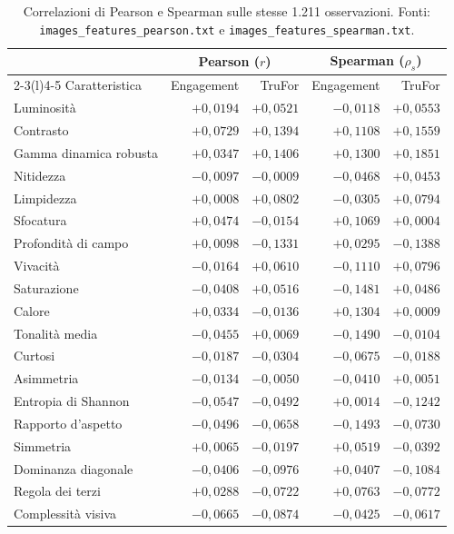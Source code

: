 \begin{table}[htbp]
    \centering
    \small
    \caption{Correlazioni di Pearson e Spearman sulle stesse 1.211 osservazioni. Fonti: \texttt{images\_features\_pearson.txt} e \texttt{images\_features\_spearman.txt}.}
    \label{tab:risultati-feature-correlazioni}
    \begin{tabular}{@{}lrrrr@{}}
        \toprule
        & \multicolumn{2}{c}{Pearson ($r$)} & \multicolumn{2}{c}{Spearman ($\rho_s$)} \\
        \cmidrule(lr){2-3}\cmidrule(l){4-5}
        Caratteristica & Engagement & TruFor & Engagement & TruFor \\
        \midrule
        Luminosità & $+0{,}0194$ & $+0{,}0521$ & $-0{,}0118$ & $+0{,}0553$ \\
        Contrasto & $+0{,}0729$ & $+0{,}1394$ & $+0{,}1108$ & $+0{,}1559$ \\
        Gamma dinamica robusta & $+0{,}0347$ & $+0{,}1406$ & $+0{,}1300$ & $+0{,}1851$ \\
        Nitidezza & $-0{,}0097$ & $-0{,}0009$ & $-0{,}0468$ & $+0{,}0453$ \\
        Limpidezza & $+0{,}0008$ & $+0{,}0802$ & $-0{,}0305$ & $+0{,}0794$ \\
        Sfocatura & $+0{,}0474$ & $-0{,}0154$ & $+0{,}1069$ & $+0{,}0004$ \\
        Profondità di campo & $+0{,}0098$ & $-0{,}1331$ & $+0{,}0295$ & $-0{,}1388$ \\
        Vivacità & $-0{,}0164$ & $+0{,}0610$ & $-0{,}1110$ & $+0{,}0796$ \\
        Saturazione & $-0{,}0408$ & $+0{,}0516$ & $-0{,}1481$ & $+0{,}0486$ \\
        Calore & $+0{,}0334$ & $-0{,}0136$ & $+0{,}1304$ & $+0{,}0009$ \\
        Tonalità media & $-0{,}0455$ & $+0{,}0069$ & $-0{,}1490$ & $-0{,}0104$ \\
        Curtosi & $-0{,}0187$ & $-0{,}0304$ & $-0{,}0675$ & $-0{,}0188$ \\
        Asimmetria & $-0{,}0134$ & $-0{,}0050$ & $-0{,}0410$ & $+0{,}0051$ \\
        Entropia di Shannon & $-0{,}0547$ & $-0{,}0492$ & $+0{,}0014$ & $-0{,}1242$ \\
        Rapporto d'aspetto & $-0{,}0496$ & $-0{,}0658$ & $-0{,}1493$ & $-0{,}0730$ \\
        Simmetria & $+0{,}0065$ & $-0{,}0197$ & $+0{,}0519$ & $-0{,}0392$ \\
        Dominanza diagonale & $-0{,}0406$ & $-0{,}0976$ & $+0{,}0407$ & $-0{,}1084$ \\
        Regola dei terzi & $+0{,}0288$ & $-0{,}0722$ & $+0{,}0763$ & $-0{,}0772$ \\
        Complessità visiva & $-0{,}0665$ & $-0{,}0874$ & $-0{,}0425$ & $-0{,}0617$ \\
        \bottomrule
    \end{tabular}
\end{table}

